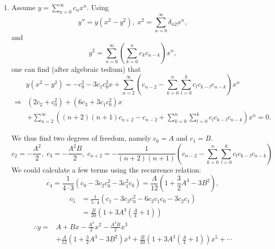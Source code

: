 \item
\begin{enumerate}[wide, labelindent=0pt, label= (\alph*)]
\item
Assume $y = \sum_{n=0}^\infty c_n x^n$.
Using
\[
	y'' = y \left( x^2 - y^2 \right),\; x^2 = \sum_{n=0}^\infty \delta_{n2} x^n,
\]
and
\[
	y^2 = \sum_{n=0}^\infty \left( \sum_{k=0}^n c_k c_{n - k} \right) x^n,
\]
one can find (after algebraic tedium) that
\[
	y \left( x^2 - y^2 \right)
	= -c_0^2 - 3c_1 c_0^2 x + \sum_{n=2}^\infty \left(
		c_{n - 2} - \sum_{k=0}^n \sum_{l=0}^k c_l c_{k - l} c_{n - k}
	\right) x^n
\]
\begin{align*}
	\Rightarrow
	&\left( 2c_2 + c_0^2 \right)
	+ \left( 6c_3 + 3c_1 c_0^2 \right) x \\
	&+ \sum_{n=2}^\infty \left(
		(n + 2)(n + 1) c_{n + 2} - c_{n - 2}
		+ \sum_{k=0}^n \sum_{l=0}^k c_l c_{k - l} c_{n - k}
	\right) x^n = 0.
\end{align*}

We thus find two degrees of freedom, namely $c_0 = A$ and $c_1 = B$.
\[
	c_2 = -\frac{A^2}{2},\;
	c_3 = -\frac{A^2 B}{2},\;
	c_{n + 2} = -\frac{1}{(n + 2)(n + 1)} \left(
		c_{n - 2} - \sum_{k=0}^n \sum_{l = 0}^k c_l c_{k - l} c_{n - k}
	\right)
\]
We could calculate a few terms using the recurrence relation:
\[
	c_4
	= \frac{1}{4 \cdot 3} \left(
		c_0 - 3c_2 c_0^2 - 3c_1^2 c_0
	\right)
	= \frac{A}{12} \left(
		1 + \frac{3}{2}A^3 - 3B^2
	\right),
\]
\begin{align*}
	c_5
	&= \frac{1}{5 \cdot 4} \left(
		c_1 - 3c_3 c_0^2 - 6c_2 c_1 c_0 - 3c_2 c_1
	\right) \\
	&= \frac{B}{20} \left(
		1 + 3A^3 \left( \frac{A}{4} + 1 \right)
	\right)
\end{align*}
\begin{align*}
	\therefore
	y
	=& A + Bx
	- \frac{A^2}{2}x^2
	- \frac{A^2 B}{2}x^3 \\
	&+ \frac{A}{12} \left(
		1 + \frac{3}{2}A^3 - 3B^2
	\right) x^4
	+ \frac{B}{20} \left(
		1 + 3A^3 \left( \frac{A}{4} + 1 \right)
	\right) x^5
	+ \cdots
\end{align*}


\end{enumerate}
